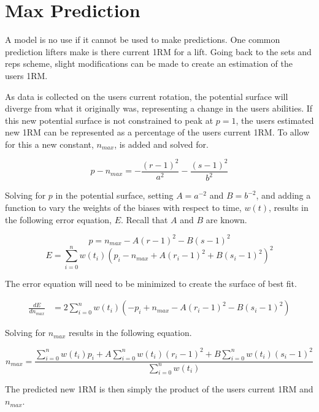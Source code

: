\section{Max Prediction}

A model is no use if it cannot be used to make predictions. One common prediction lifters make is there current 1RM for a lift. Going back to the sets and reps scheme, slight modifications can be made to create an estimation of the users 1RM.

As data is collected on the users current rotation, the potential surface will diverge from what it originally was, representing a change in the users abilities. If this new potential surface is not constrained to peak at $p=1$, the users estimated new 1RM can be represented as a percentage of the users current 1RM. To allow for this a new constant, $n_{max}$, is added and solved for.

\begin{equation*}
    p-n_{max}=-\frac{(r-1)^2}{a^2}-\frac{(s-1)^2}{b^2}
\end{equation*}

Solving for $p$ in the potential surface, setting $A=a^{-2}$ and $B=b^{-2}$, and adding a function to vary the weights of the biases with respect to time, $w(t)$, results in the following error equation, $E$. Recall that $A$ and $B$ are known.

\[ p=n_{max}-A(r-1)^2-B(s-1)^2 \]
\[ E=\sum_{i=0}^{n} w(t_i)\left(p_i-n_{max}+A(r_i-1)^2+B(s_i-1)^2 \right)^2 \]

The error equation will need to be minimized to create the surface of best fit.

\begin{equation*}
    \begin{split}
        \frac{d E}{d n_{max}}
        &=2\sum_{i=0}^{n}w(t_i)\left( -p_i+n_{max}-A(r_i-1)^2-B(s_i-1)^2 \right)
    \end{split}
\end{equation*}

Solving for $n_{max}$ results in the following equation.

\begin{equation}
    n_{max}=\frac{\sum_{i=0}^{n}w(t_i)p_i+
                  A\sum_{i=0}^{n}w(t_i)(r_i-1)^2+
                  B\sum_{i=0}^{n}w(t_i)(s_i-1)^2}{\sum_{i=0}^{n}w(t_i)}
\end{equation}

The predicted new 1RM is then simply the product of the users current 1RM and $n_{max}$.


